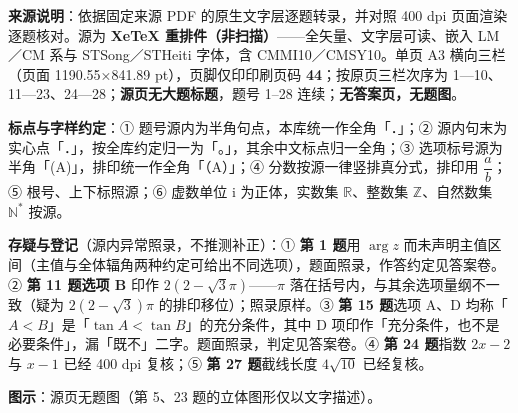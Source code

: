


\begin{gktip}
\textbf{来源说明}：依据固定来源 PDF 的原生文字层逐题转录，并对照 400 dpi 页面渲染逐题核对。源为 \textbf{XeTeX 重排件（非扫描）}——全矢量、文字层可读、嵌入 LM／CM 系与 STSong／STHeiti 字体，含 CMMI10／CMSY10。单页 A3 横向三栏（页面 1190.55×841.89 pt），页脚仅印印刷页码 \textbf{44}；按原页三栏次序为 1—10、11—23、24—28；\textbf{源页无大题标题}，题号 1–28 连续；\textbf{无答案页，无题图}。

\textbf{标点与字样约定}：① 题号源内为半角句点，本库统一作全角「．」；② 源内句末为实心点「．」，按全库约定归一为「。」，其余中文标点归一全角；③ 选项标号源为半角「(A)」，排印统一作全角「（A）」；④ 分数按源一律竖排真分式，排印用 \(\dfrac{a}{b}\)；⑤ 根号、上下标照源；⑥ 虚数单位 \(\mathrm{i}\) 为正体，实数集 \(\mathbb R\)、整数集 \(\mathbb Z\)、自然数集 \(\mathbb N^*\) 按源。

\textbf{存疑与登记}（源内异常照录，不推测补正）：① \textbf{第 1 题}用 \(\arg z\) 而未声明主值区间（主值与全体辐角两种约定可给出不同选项），题面照录，作答约定见答案卷。② \textbf{第 11 题选项 B} 印作 \(2(2-\sqrt3\pi)\)——\(\pi\) 落在括号内，与其余选项量纲不一致（疑为 \(2(2-\sqrt3)\pi\) 的排印移位）；照录原样。③ \textbf{第 15 题}选项 A、D 均称「\(A<B\)」是「\(\tan A<\tan B\)」的充分条件，其中 D 项印作「充分条件，也不是必要条件」，漏「既不」二字。题面照录，判定见答案卷。④ \textbf{第 24 题}指数 \(2x-2\) 与 \(x-1\) 已经 400 dpi 复核；⑤ \textbf{第 27 题}截线长度 \(4\sqrt{10}\) 已经复核。

\textbf{图示}：源页无题图（第 5、23 题的立体图形仅以文字描述）。
\end{gktip}

